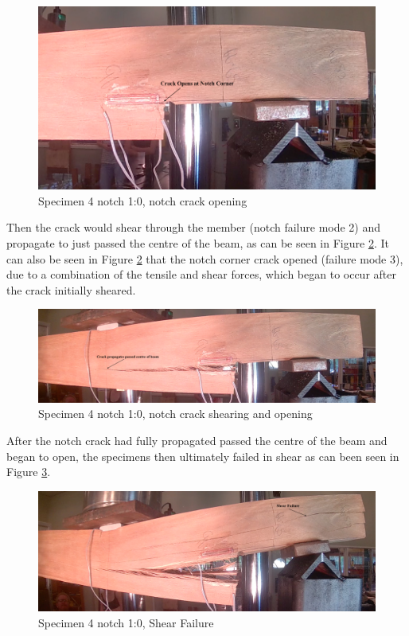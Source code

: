 \documentclass[11pt,a4paper]{article}
\numberwithin{equation}{subsection}
\begin{document}
\begin{figure}[h]
	\begin{center}
		\includegraphics[scale=0.5]{Rect_Crack_Open}
	\end{center}
	\caption{Specimen 4 notch 1:0, notch crack opening}
	\label{fig:Rect_Crack}
\end{figure}
\pagebreak
\noindent
Then the crack would shear through the member (notch failure mode 2) and propagate to just passed the centre of the beam, as can be seen in Figure \ref{fig:Rect_Prop}. It can also be seen in Figure \ref{fig:Rect_Prop} that the notch corner crack opened (failure mode 3), due to a combination of the tensile and shear forces, which began to occur after the crack initially sheared.  

\begin{figure}[h]
	\begin{center}
		\includegraphics[scale=0.31]{Rect_propegate}
	\end{center}
	\caption{Specimen 4 notch 1:0, notch crack shearing and opening}
	\label{fig:Rect_Prop}
\end{figure}
\pagebreak

\noindent
After the notch crack had fully propagated passed the centre of the beam and began to open, the specimens then ultimately failed in shear as can been seen in Figure \ref{fig:Rect_Shear}. 

\begin{figure}[h]
	\begin{center}
		\includegraphics[scale=0.31]{Rect_Shear}
	\end{center}
	\caption{Specimen 4 notch 1:0, Shear Failure}
	\label{fig:Rect_Shear}
\end{figure}
\end{document}
